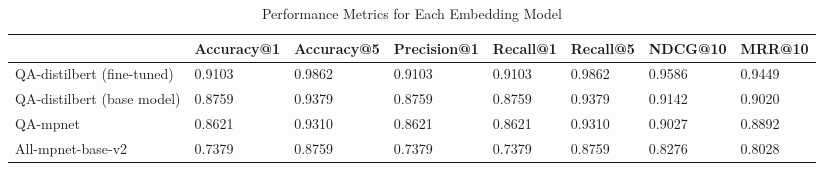\begin{table}
\caption{Performance Metrics for Each Embedding Model}
\label{tab:performance_metrics}
\begin{tabular}{llllllll}
\toprule
 & Accuracy@1 & Accuracy@5 & Precision@1 & Recall@1 & Recall@5 & NDCG@10 & MRR@10 \\
\midrule
QA-distilbert (fine-tuned) & 0.9103 & 0.9862 & 0.9103 & 0.9103 & 0.9862 & 0.9586 & 0.9449 \\
QA-distilbert (base model) & 0.8759 & 0.9379 & 0.8759 & 0.8759 & 0.9379 & 0.9142 & 0.9020 \\
QA-mpnet & 0.8621 & 0.9310 & 0.8621 & 0.8621 & 0.9310 & 0.9027 & 0.8892 \\
All-mpnet-base-v2 & 0.7379 & 0.8759 & 0.7379 & 0.7379 & 0.8759 & 0.8276 & 0.8028 \\
\bottomrule
\end{tabular}
\end{table}
